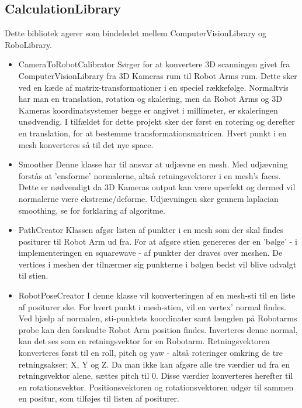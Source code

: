 \subsection{CalculationLibrary}
Dette bibliotek agerer som bindeledet mellem ComputerVisionLibrary og RoboLibrary.

\begin{itemize}
\item{CameraToRobotCalibrator} \newline
Sørger for at konvertere 3D scanningen givet fra ComputerVisionLibrary fra 3D Kameras rum til Robot Arms rum.
Dette sker ved en kæde af matrix-transformationer i en speciel rækkefølge. 
Normaltvis har man en translation, rotation og skalering, men da Robot Arms og 3D Kameras koordinatsystemer begge er angivet i millimeter, er skaleringen unødvendig.
I tilfældet for dette projekt sker der først en rotering og derefter en translation, for at bestemme transformationsmatricen. 
Hvert punkt i en mesh konverteres så til det nye space.

\item{Smoother}\newline
Denne klasse har til ansvar at udjævne en mesh. Med udjævning forstås at 'ensforme' normalerne, altså retningsvektorer i en mesh's faces.
Dette er nødvendigt da 3D Kameras output kan være uperfekt og dermed vil normalerne være ekstreme/deforme. Udjævningen sker gennem laplacian smoothing, se \cite{Smooth} for forklaring af algoritme.

\item{PathCreator}\newline
Klassen afgør listen af punkter i en mesh som der skal findes positurer til Robot Arm ud fra.
For at afgøre stien genereres der en 'bølge' - i implementeringen en squarewave - af punkter der draves over meshen.
De vertices i meshen der tilnærmer sig punkterne i bølgen bedst vil blive udvalgt til stien.

\item{RobotPoseCreator}\newline
I denne klasse vil konverteringen af en mesh-sti til en liste af positurer ske.
For hvert punkt i mesh-stien, vil en vertex' normal findes. 
Ved hjælp af normalen, sti-punktets koordinater samt længden på Robotarms probe kan den forskudte Robot Arm position findes.
Inverteres denne normal, kan det ses som en retningsvektor for en Robotarm.
Retningsvektoren konverteres først til en roll, pitch og yaw - altså roteringer omkring de tre retningsakser; X, Y og Z.
Da man ikke kan afgøre alle tre værdier ud fra en retningsvektor alene, sættes pitch til 0. Disse værdier konverteres herefter til en rotationsvektor.
Positionsvektoren og rotationsvektoren udgør til sammen en positur, som tilføjes til listen af positurer.
\end{itemize}

